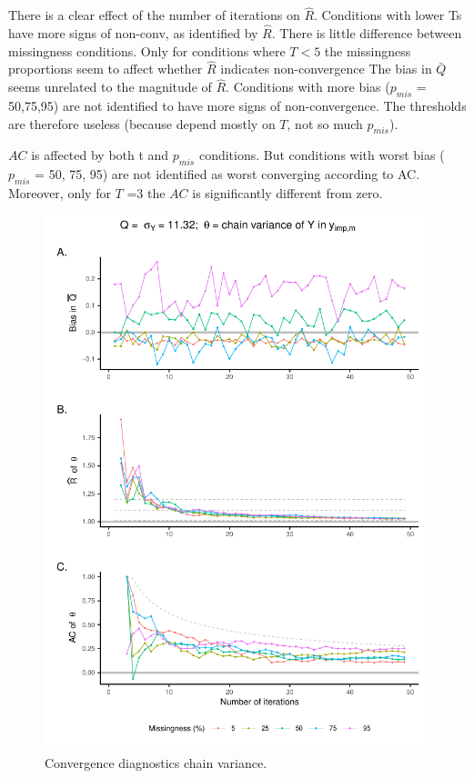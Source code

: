 \documentclass[Royal,times,sageh]{sagej}
\begin{document}
There is a clear effect of the number of iterations on \(\widehat{R}\).
Conditions with lower Ts have more signs of non-conv, as identified by
\(\widehat{R}\). There is little difference between missingness
conditions. Only for conditions where \(T<5\) the missingness
proportions seem to affect whether \(\widehat{R}\) indicates
non-convergence The bias in \(\bar{Q}\) seems unrelated to the magnitude
of \(\widehat{R}\). Conditions with more bias (\(p_{mis}\) = 50,75,95)
are not identified to have more signs of non-convergence. The thresholds
are therefore useless (because depend mostly on \(T\), not so much
\(p_{mis}\)).

\(AC\) is affected by both t and \(p_{mis}\) conditions. But conditions
with worst bias (\(p_{mis}\) = 50, 75, 95) are not identified as worst
converging according to AC. Moreover, only for \(T\) =3 the \(AC\) is
significantly different from zero.

\begin{figure}

{\centering \includegraphics{manuscript_files/figure-latex/sd-1} 

}

\caption{Convergence diagnostics chain variance.}\label{fig:sd}
\end{figure}
\end{document}
